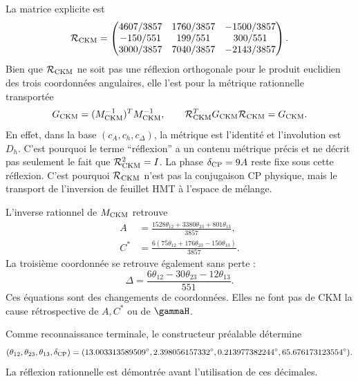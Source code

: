 La matrice explicite est
\begin{equation}
\label{rm:eq:modular-Rckm-matrix}
\mathcal R_{\rm CKM}=
\begin{pmatrix}
4607/3857&1760/3857&-1500/3857\\
-150/551&199/551&300/551\\
3000/3857&7040/3857&-2143/3857
\end{pmatrix}.
\end{equation}
Bien que \(\mathcal R_{\rm CKM}\) ne soit pas une réflexion orthogonale pour le
produit euclidien des trois coordonnées angulaires, elle l'est pour la
métrique rationnelle transportée
\begin{equation}
\label{rm:eq:modular-ckm-metric}
G_{\rm CKM}=(M_{\rm CKM}^{-1})^TM_{\rm CKM}^{-1},
\qquad
\mathcal R_{\rm CKM}^TG_{\rm CKM}\mathcal R_{\rm CKM}=G_{\rm CKM}.
\end{equation}
En effet, dans la base \((c_A,c_h,c_\Delta)\), la métrique est l'identité
et l'involution est \(D_h\). C'est pourquoi le terme ``réflexion'' a un
contenu métrique précis et ne décrit pas seulement le fait que
\(\mathcal R_{\rm CKM}^2=I\).
La phase \(\delta_{\rm CP}=9A\) reste fixe sous cette réflexion. C'est
pourquoi \(\mathcal R_{\rm CKM}\) n'est pas la conjugaison CP physique, mais le
transport de l'inversion de feuillet HMT à l'espace de mélange.

L'inverse rationnel de \(M_{\rm CKM}\) retrouve
\begin{align}
A&=\frac{1528\theta_{12}+3380\theta_{23}+801\theta_{13}}{3857},
\label{rm:eq:modular-A-from-ckm}\\
C^*&=\frac{6(75\theta_{12}+176\theta_{23}-150\theta_{13})}{3857}.
\label{rm:eq:modular-C-from-ckm}
\end{align}
La troisième coordonnée se retrouve également sans perte :
\begin{equation}
\label{rm:eq:modular-Delta-from-ckm}
\Delta
=\frac{6\theta_{12}-30\theta_{23}-12\theta_{13}}{551}.
\end{equation}
Ces équations sont des changements de coordonnées. Elles ne font pas de CKM la cause
rétrospective de \(A,C^*\) ou de \(\gammaH\).

Comme reconnaissance terminale, le constructeur préalable détermine
\begin{equation}
\label{rm:eq:modular-ckm-values}
(\theta_{12},\theta_{23},\theta_{13},\delta_{\rm CP})
=(13.003313589509^\circ,
2.398056157332^\circ,
0.213977382244^\circ,
65.676173123554^\circ).
\end{equation}
La réflexion rationnelle est démontrée avant l'utilisation de ces décimales.

